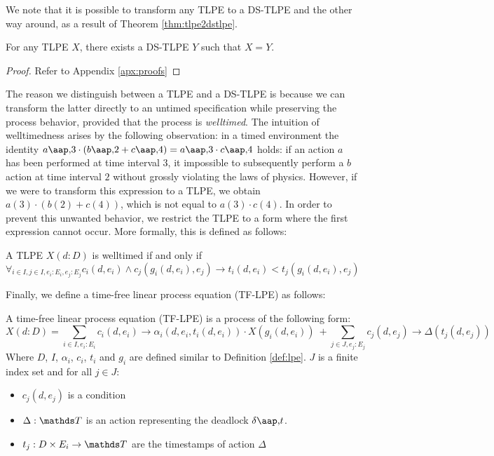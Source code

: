 We note that it is possible to transform any TLPE to a DS-TLPE and the other way around, as a result of Theorem \ref{thm:tlpe2dstlpe}.
\\
\begin{theorem} \label{thm:tlpe2dstlpe} For any TLPE $X$, there exists a DS-TLPE $Y$ such that $X = Y$. \end{theorem}
\begin{proof} Refer to Appendix \ref{apx:proofs} \end{proof}

 The reason we distinguish between a TLPE and a DS-TLPE is because we can transform the latter directly to an untimed specification while preserving the process behavior, provided that the process is \emph{welltimed}. The intuition of welltimedness arises by the following observation: in a timed environment the identity $a \at 3 \cdot (b \at 2 + c \at 4) = a \at 3 \cdot c \at 4$ holds: if an action $a$ has been performed at time interval $3$, it impossible to subsequently perform a $b$ action at time interval $2$ without grossly violating the laws of physics. However, if we were to transform this expression to a TLPE, we obtain $a(3) \cdot (b(2) + c(4))$, which is not equal to $a(3) \cdot c(4)$. In order to prevent this unwanted behavior, we restrict the TLPE to a form where the first expression cannot occur. More formally, this is defined as follows:
\\
\begin{definition}
A TLPE $X(d:D)$ is welltimed if and only if
\begin{displaymath} \forall_{i \in I,j \in I,e_i: E_i,e_j: E_j} c_i(d,e_i) \land c_j(g_i(d, e_i), e_j) \rightarrow t_i(d,e_i) < t_j(g_i(d, e_i), e_j) \end{displaymath} 
\end{definition}

Finally, we define a time-free linear process equation (TF-LPE) as follows:
\\
\begin{definition}
A time-free linear process equation (TF-LPE) is a process of the following form:
\begin{displaymath}
X(d:D) = \sum_{i \in I, e_i: E_i} c_i(d,e_i) \rightarrow \alpha_i(d, e_i, t_i(d,e_i)) \cdot X(g_i(d, e_i))~+
\sum_{j \in J, e_j: E_j} c_j(d,e_j) \rightarrow \Delta(t_j(d,e_j))
\end{displaymath}
Where $D$, $I$, $\alpha_i$, $c_i$, $t_i$ and $g_i$ are defined similar to Definition \ref{def:lpe}. $J$ is a finite index set and for all $j \in J$: 
\begin{itemize}
\item $c_j(d,e_j)$ is a condition
\item $\Delta: \TTT$ is an action representing the deadlock $\delta \at t$.
\item $t_j: D \times E_i \rightarrow \TTT$ are the timestamps of action $\Delta$
\end{itemize}
\end{definition}

